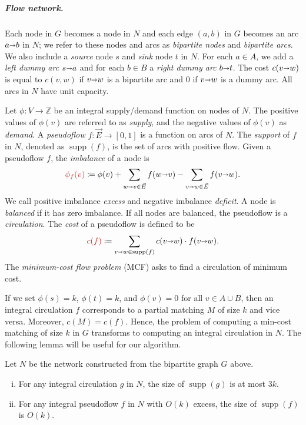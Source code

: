 \documentclass[a4paper,UKenglish,nolineno]{socg-lipics-v2019}
\def\ints{\mathbb{Z}}
\def\Set#1{\left\{ #1 \right\}}
\def\fsupply{\phi}
\def\arcto{\mathord\shortrightarrow}
\def\arc#1#2{#1\arcto#2}
\def\cost{c}
\def\supp{\operatorname{supp}}
\def\EMPH#1{\textcolor{BrickRed}{{\emph{#1}}}}
\begin{document}
\subparagraph{Flow network.}
Each node in $G$ becomes a node in $N$ and each edge
$(a, b)$ in $G$ becomes an arc $\arc{a}{b}$ in $N$;
we refer to these nodes and arcs as \EMPH{bipartite nodes} and \EMPH{bipartite arcs}.
We also include a \EMPH{source} node $s$ and \EMPH{sink} node $t$ in $N$.
For each $a \in A$, we add a \EMPH{left dummy arc} $\arc{s}{a}$ and for each
$b \in B$ a \EMPH{right dummy arc} $\arc{b}{t}$.
The cost \EMPH{$c(\arc{v}{w})$}
is equal to $c(v, w)$ if
$\arc{v}{w}$ is a bipartite arc and $0$ if $\arc{v}{w}$ is a dummy arc.
All arcs in $N$ have unit capacity.

Let $\fsupply: V \to \ints$ be an integral supply/demand function on nodes of $N$.
The positive values of $\fsupply(v)$ are referred to as \EMPH{supply}, and the
negative values of $\fsupply(v)$ as \EMPH{demand}.
A \EMPH{pseudoflow} $f: \vec{E} \to [0, 1]$ is a function on arcs of $N$.
The \EMPH{support} of $f$ in $N$, denoted as \EMPH{$\supp(f)$}, is the set of arcs with positive flow.
Given a pseudoflow $f$, the \EMPH{imbalance} of a node is
\[
\EMPH{$\fsupply_f (v)$} \coloneqq \fsupply(v) + \sum_{\arc wv \in \vec{E}}{f(\arc wv)} - \sum_{\arc vw \in \vec{E}}{f(\arc vw)}.
\]
We call positive imbalance \EMPH{excess} and negative imbalance \EMPH{deficit}.
A node is \EMPH{balanced} if it has zero imbalance.
If all nodes are balanced, the pseudoflow is a \EMPH{circulation}.
The \EMPH{cost} of a pseudoflow is defined to be
\[
 \EMPH{$\cost(f)$} \coloneqq \sum_{\arc vw \in \supp(f)} c(\arc vw) \cdot f(\arc vw).
\]
The \EMPH{minimum-cost flow problem} (MCF) asks to find a circulation of minimum cost.

If we set $\fsupply(s) = k$, $\fsupply(t) = k$, and $\fsupply(v) = 0$ for all
$v \in A \cup B$, then an integral circulation $f$ corresponds to a partial
matching $M$ of size $k$ and vice versa.
Moreover, $\cost(M) = \cost(f)$.
%
Hence, the problem of computing a min-cost matching of size $k$ in $G$
transforms to computing an integral circulation in $N$.
The following lemma will be useful for our algorithm.

\begin{lemma}
\label{lemma:supp_size}
Let $N$ be the network constructed from the bipartite graph $G$ above.
\begin{enumerate}[(i)]
\item For any integral circulation $g$ in $N$, the size of $\supp(g)$ is at most $3k$.
\item For any integral pseudoflow $f$ in $N$ with $O(k)$ excess, the size of $\supp(f)$ is $O(k)$.
\end{enumerate}
\end{lemma}
\end{document}
